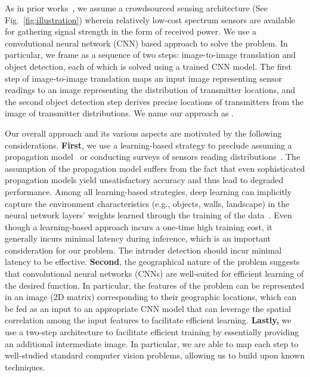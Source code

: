   As in prior
works~\cite{mobicom17-splot,chakraborty2017specsense}, we assume a
crowdsourced sensing architecture (See Fig.~\ref{fig:illustration}) wherein relatively low-cost spectrum
sensors are available for gathering signal strength in the form of received power.
We use a convolutional neural network (CNN) based approach
to solve the \mtl problem. In particular, we frame
\mtl as a sequence of two steps: image-to-image translation and object detection, each of which
is solved using a trained CNN model. 
The first step of image-to-image translation maps an input image representing sensor readings to an 
image representing the distribution of transmitter locations, and the second object detection step derives precise
locations of transmitters from the image of transmitter distributions.
We name our \mtl approach as \our.

Our overall approach and its various aspects are motivated by the following considerations. 
{\bf First}, we use a learning-based strategy to 
preclude assuming a propagation model~\cite{mobicom17-splot} or conducting surveys of sensors reading distributions~\cite{ipsn20-mtl}.
The assumption of the propagation model suffers from the fact that 
even sophisticated propagation models yield unsatisfactory accuracy and thus lead to degraded performance.
Among all learning-based strategies, deep learning can implicitly capture the environment characteristics (e.g., objects, walls, landscape) in the neural network layers' weights learned through the training of the data~\cite{mobicom20-deeploc}.
Even though a learning-based approach incurs a one-time high training cost,
it generally incurs minimal latency during inference, which is an important consideration for our \mtl problem.
The intruder detection should incur minimal latency to be effective.
{\bf Second}, the geographical nature of the \mtl problem suggests that convolutional neural networks (CNNs) are 
well-suited for efficient
learning of the desired function. In particular, the features of the \mtl problem can be
represented in an image (2D matrix) corresponding to their geographic locations, which can be fed as an input
to an appropriate CNN model that can leverage the spatial correlation among the input features 
to facilitate efficient learning. 
{\bf Lastly,} we use a two-step architecture to facilitate efficient training by essentially
providing an additional intermediate image. 
In particular,  we are able to map each step to well-studied standard computer vision problems, allowing us to build upon known techniques. 

